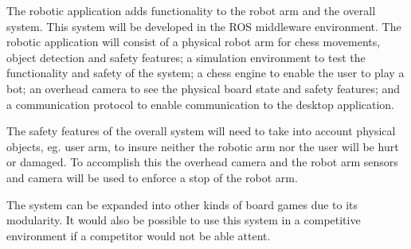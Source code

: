 \documentclass[11pt,fleqn,twoside]{article}
\begin{document}
\noindent The robotic application adds functionality to the robot arm and the overall system. This system will be 
developed in the ROS middleware environment\cite{ros}. The robotic application will consist of a physical robot arm for chess
movements, object detection and safety features; a simulation environment to test the functionality and safety of the 
system; a chess engine to enable the user to play a bot; an overhead camera to see the physical board state and safety 
features; and a communication protocol to enable communication to the desktop application.\newline 

\noindent The safety features of the overall system will need to take into account physical objects, eg. user arm,
to insure neither the robotic arm nor the user will be hurt or damaged. To accomplish this the overhead camera and 
the robot arm sensors and camera will be used to enforce a stop of the robot arm.\newline

\noindent The system can be expanded into other kinds of board games due to its modularity. It would also be possible to 
use this system in a competitive environment if a competitor would not be able attent. \newline

\end{document}
